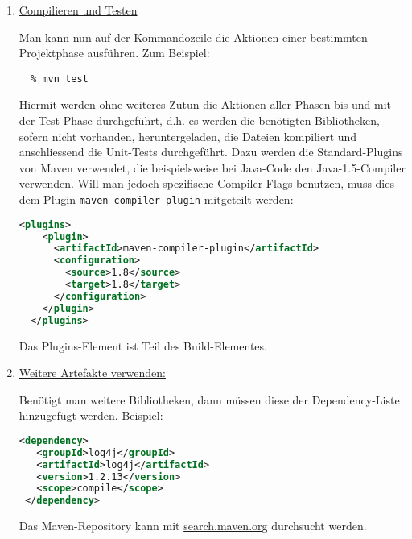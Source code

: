 \begin{enumerate}
\newslide
Hiermit ist nun die in Abbildung \ref{fig:maven-dirstruct} gezeigte
Verzeichnisstruktur entstanden.
\begin{figure}[H]
  \centering
\ifslides
  \texttt{[image: config-management/maven-dirstruct]}
\else
  \texttt{[image: config-management/maven-dirstruct]}
\fi
  \caption{Verzeichnisstruktur eines Maven-Projektes}
  \label{fig:maven-dirstruct}
\end{figure}
\newslide
Mit archetype:generate wird eine Auswahl möglicher Projektvorlagen präsentiert, die mit dem Argument -Dfilter
eingegrenzt werden kann.
%
\newslide
\item \underline{Compilieren und Testen}

Man kann nun auf der Kommandozeile die Aktionen einer bestimmten Projektphase
ausführen. Zum Beispiel:
\begin{lstlisting}
  % mvn test
\end{lstlisting}
Hiermit werden ohne weiteres Zutun die Aktionen aller Phasen bis und
mit der Test-Phase durchgeführt, d.h. es werden die benötigten
Bibliotheken, sofern
nicht vorhanden, heruntergeladen,
die Dateien kompiliert und anschliessend die Unit-Tests
durchgeführt. Dazu werden die Standard-Plugins von Maven verwendet, die
beispielsweise bei Java-Code den Java-1.5-Compiler verwenden.
\newslide
Will man jedoch
 spezifische Compiler-Flags benutzen, muss dies dem
 Plugin \verb+maven-compiler-plugin+ mitgeteilt werden:
\begin{lstlisting}[language=xml,
  morekeywords={plugins,plugin,configuration,artifactId,source,target}]
  <plugins>
    <plugin>
      <artifactId>maven-compiler-plugin</artifactId>
      <configuration>
        <source>1.8</source>
        <target>1.8</target>
      </configuration>
    </plugin>
  </plugins>
\end{lstlisting}
Das Plugins-Element ist Teil des Build-Elementes.
\newslide
\item \underline{Weitere Artefakte verwenden:}

Benötigt man weitere Bibliotheken, dann müssen diese der Dependency-Liste
  hinzugefügt werden. Beispiel:
  \begin{lstlisting}[language=xml,
    morekeywords={dependency,groupId,artifactId,version,scope}]
 <dependency>
   <groupId>log4j</groupId>
   <artifactId>log4j</artifactId>
   <version>1.2.13</version>
   <scope>compile</scope>
 </dependency>
  \end{lstlisting}
Das Maven-Repository kann mit
\href{https://search.maven.org}{search.maven.org}
durchsucht werden.


\end{enumerate}
